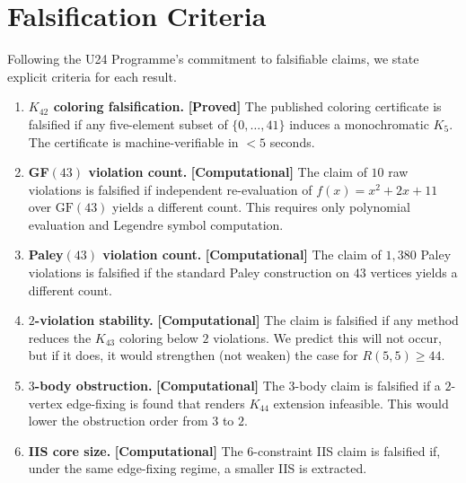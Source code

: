 \documentclass[12pt,a4paper]{article}
\newcommand{\proved}[1]{\textcolor{proved}{\textbf{[Proved]}} #1}
\newcommand{\computational}[1]{\textcolor{computational}{\textbf{[Computational]}} #1}
\theoremstyle{definition}
\theoremstyle{remark}
\newcommand{\GF}[1]{\mathrm{GF}(#1)}
\newcommand{\Kn}[1]{K_{#1}}
\newcommand{\Rnum}[2]{R(#1,#2)}
\begin{document}
\section{Falsification Criteria}\label{sec:falsification}

Following the U24 Programme's commitment to falsifiable claims, we state explicit criteria for each result.

\begin{enumerate}[label=\textbf{F\arabic*.}, leftmargin=2.5em]
    \item \textbf{$\Kn{42}$ coloring falsification.}  \proved{The published coloring certificate is falsified if any five-element subset of $\{0, \ldots, 41\}$ induces a monochromatic $K_5$.}  The certificate is machine-verifiable in $< 5$ seconds.

    \item \textbf{GF$(43)$ violation count.}  \computational{The claim of $10$ raw violations is falsified if independent re-evaluation of $f(x) = x^2 + 2x + 11$ over $\GF{43}$ yields a different count.}  This requires only polynomial evaluation and Legendre symbol computation.

    \item \textbf{Paley$(43)$ violation count.}  \computational{The claim of $1{,}380$ Paley violations is falsified if the standard Paley construction on $43$ vertices yields a different count.}

    \item \textbf{$2$-violation stability.}  \computational{The claim is falsified if any method reduces the $\Kn{43}$ coloring below $2$ violations.}  We predict this will not occur, but if it does, it would strengthen (not weaken) the case for $\Rnum{5}{5} \ge 44$.

    \item \textbf{$3$-body obstruction.}  \computational{The $3$-body claim is falsified if a $2$-vertex edge-fixing is found that renders $\Kn{44}$ extension infeasible.}  This would lower the obstruction order from $3$ to $2$.

    \item \textbf{IIS core size.}  \computational{The $6$-constraint IIS claim is falsified if, under the same edge-fixing regime, a smaller IIS is extracted.}
\end{enumerate}

\end{document}
